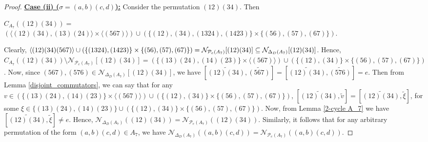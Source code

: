 \documentclass[12pt,a4paper]{article}
\begin{document}
\begin{proof}
\vspace{.3cm}
\noindent\underline{\bf{Case (ii) ($\sigma=(a,b)(c,d)$):}} Consider the permutation $(12)(34)$. Then
\begin{center}
$C_{A_7}((12)(34))=$\\
$(\langle (12)(34),(13)(24)\rangle\times\langle (567)\rangle)\cup(\{(12),(34),(1324),(1423)\}\times\{(56),(57),(67)\}).$   
\end{center}
\vspace{.15cm}
Clearly, $\langle(12)(34)(567)\rangle\cup(\{(1324),(1423)\}\times\{(56),(57),(67)\})=\mathcal{N}_{\mathcal{P}_e(A_7)}[(12)(34)]\subseteq \\ \mathcal{N}_{\Delta_D(A_7)}[(12)(34)]$. Hence, $C_{A_7}((12)(34))\setminus\mathcal{N}_{\mathcal{P}_e(A_7)}[(12)(34)]=(\{(13)(24),(14)(23)\}\times\langle(567)\rangle)\cup(\{(12),(34)\}\times\{(56),(57),(67)\})$. Now, since $(567),(576)\in\mathcal{N}_{\Delta_D(A_7)}[(12)(34)]$, we have $[\tilde{(12)(34)},\tilde{(567)}]=[\tilde{(12)(34)},\tilde{(576)}]=e$. Then from Lemma \ref{disjoint_commutators}, we can say that for any $v\in (\{(13)(24),(14)(23)\}\times\langle(567)\rangle)\cup(\{(12),(34)\}\times\{(56),(57),(67)\})$, $[\tilde{(12)(34)},\tilde{v}]=[\tilde{(12)(34)},\tilde{\xi}]$, for some $\xi\in\{(13)(24),(14)(23)\}\cup(\{(12),(34)\}\times\{(56),(57),(67)\})$. Now, from Lemma \ref{2-cycle A_7} we have $[\tilde{(12)(34)},\tilde{\xi}]\neq e$. Hence, $\mathcal{N}_{\Delta_D(A_7)}((12)(34))=\mathcal{N}_{\mathcal{P}_e(A_7)}((12)(34))$. Similarly, it follows that for any arbitrary permutation of the form $(a,b)(c,d)\in A_7$, we have $\mathcal{N}_{\Delta_D(A_7)}((a,b)(c,d))=\mathcal{N}_{\mathcal{P}_e(A_7)}((a,b)(c,d))$.  


\end{proof}
\end{document}
